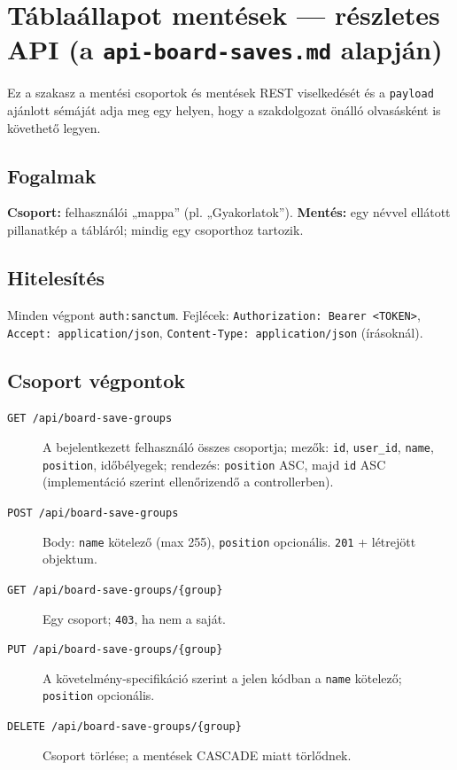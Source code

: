 \section{Táblaállapot mentések — részletes API (a \texttt{api-board-saves.md} alapján)}
Ez a szakasz a mentési csoportok és mentések REST viselkedését és a \texttt{payload} ajánlott sémáját adja meg egy helyen, hogy a szakdolgozat önálló olvasásként is követhető legyen.

\subsection{Fogalmak}
\textbf{Csoport:} felhasználói „mappa” (pl. „Gyakorlatok”). \textbf{Mentés:} egy névvel ellátott pillanatkép a tábláról; mindig egy csoporthoz tartozik.

\subsection{Hitelesítés}
Minden végpont \texttt{auth:sanctum}. Fejlécek: \texttt{Authorization: Bearer <TOKEN>}, \texttt{Accept: application/json}, \texttt{Content-Type: application/json} (írásoknál).

\subsection{Csoport végpontok}
\begin{description}
  \item[\texttt{GET /api/board-save-groups}] A bejelentkezett felhasználó összes csoportja; mezők: \texttt{id}, \texttt{user\_id}, \texttt{name}, \texttt{position}, időbélyegek; rendezés: \texttt{position} ASC, majd \texttt{id} ASC (implementáció szerint ellenőrizendő a controllerben).
  \item[\texttt{POST /api/board-save-groups}] Body: \texttt{name} kötelező (max 255), \texttt{position} opcionális. \texttt{201} + létrejött objektum.
  \item[\texttt{GET /api/board-save-groups/\{group\}}] Egy csoport; \texttt{403}, ha nem a saját.
  \item[\texttt{PUT /api/board-save-groups/\{group\}}] A követelmény-specifikáció szerint a jelen kódban a \texttt{name} kötelező; \texttt{position} opcionális.
  \item[\texttt{DELETE /api/board-save-groups/\{group\}}] Csoport törlése; a mentések CASCADE miatt törlődnek.
\end{description}

